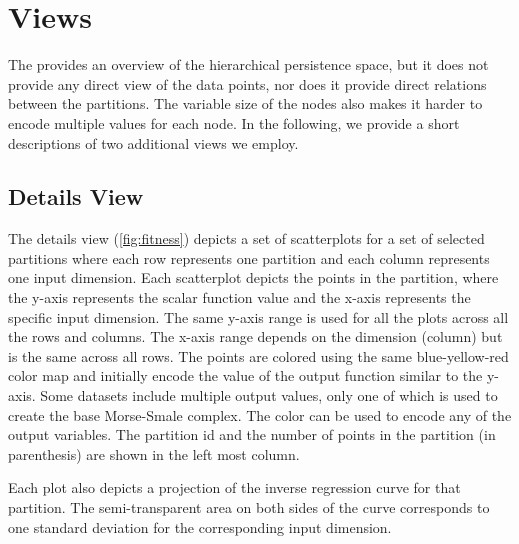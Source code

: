 
\vspace{-.1in}
\section{Views}
The \RT provides an overview of the hierarchical persistence space, but it does not provide any direct view of the data points, nor does it provide direct relations between the partitions. The variable size of the nodes also makes it harder to encode multiple values for each node. In the following, we provide a short descriptions of two additional views we employ. 

\subsection{Details View}

The details view (\autoref{fig:fitness}) depicts a set of scatterplots for a set of selected partitions where each row represents one partition and each column represents one input dimension. Each scatterplot depicts the points in the partition, where the y-axis represents the scalar function value and the x-axis represents the specific input dimension. The same y-axis range is used for all the plots across all the rows and columns. The x-axis range depends on the dimension (column) but is the same across all rows. The points are colored using the same blue-yellow-red color map and initially encode the value of the output function similar to the y-axis. Some datasets include multiple output values, only one of which is used to create the base Morse-Smale complex. The color can be used to encode any of the output variables. The partition id and the number of points in the partition (in parenthesis) are shown in the left most column. 

Each plot also depicts a projection of the inverse regression curve for that partition. The semi-transparent area on both sides of the curve corresponds to one standard deviation for the corresponding input dimension. 

